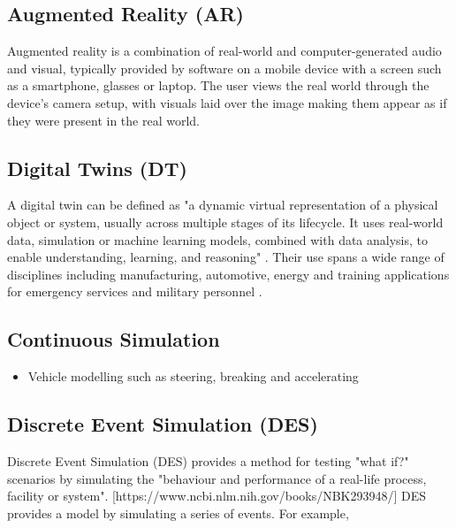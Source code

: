 \documentclass{article}
\begin{document}
\subsection{Augmented Reality (AR)}

Augmented reality is a combination of real-world and computer-generated audio and visual, typically provided by software on a mobile device with a screen such as a smartphone, glasses or laptop. The user views the real world through the device's camera setup, with visuals laid over the image making them appear as if they were present in the real world.


\subsection{Digital Twins (DT)}

A digital twin can be defined as "a dynamic virtual representation of a physical object or system, usually across multiple stages of its lifecycle. It uses real-world data, simulation or machine learning models, combined with data analysis, to enable understanding, learning, and reasoning" \cite{stanford2019digital}. Their use spans a wide range of disciplines including manufacturing, automotive, energy \cite{PYLIANIDIS2021105942} and training applications for emergency services \cite{ScientificReports1} and military personnel \cite{9345490}.

\subsection{Continuous Simulation}


\begin{itemize}
  \item Vehicle modelling such as steering, breaking and accelerating
\end{itemize}

\subsection{Discrete Event Simulation (DES)}



Discrete Event Simulation (DES) provides a method for testing "what if?" scenarios by simulating the "behaviour and performance of a real-life process, facility or system". [https://www.ncbi.nlm.nih.gov/books/NBK293948/] DES provides a model by simulating a series of events. For example, 
\end{document}
